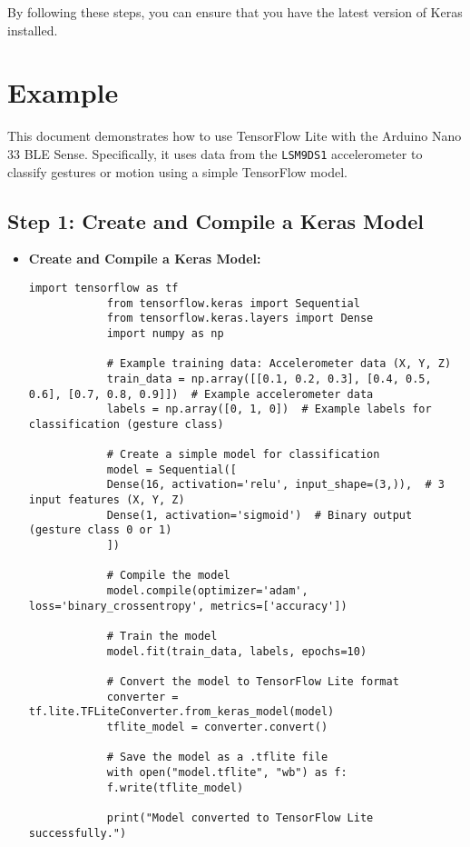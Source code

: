 	By following these steps, you can ensure that you have the latest version of Keras installed.
	
	
	\section{Example}
	This document demonstrates how to use TensorFlow Lite with the Arduino Nano 33 BLE Sense. Specifically, it uses data from the \texttt{LSM9DS1} accelerometer to classify gestures or motion using a simple TensorFlow model.
	
	\subsection{Step 1: Create and Compile a Keras Model}
	
	\begin{itemize}
		\item \textbf{Create and Compile a Keras Model:}
		\begin{lstlisting}[caption={Creating a Keras Model}, label={code:create-keras-model}, style=pythonstyle]
			import tensorflow as tf
			from tensorflow.keras import Sequential
			from tensorflow.keras.layers import Dense
			import numpy as np
			
			# Example training data: Accelerometer data (X, Y, Z)
			train_data = np.array([[0.1, 0.2, 0.3], [0.4, 0.5, 0.6], [0.7, 0.8, 0.9]])  # Example accelerometer data
			labels = np.array([0, 1, 0])  # Example labels for classification (gesture class)
			
			# Create a simple model for classification
			model = Sequential([
			Dense(16, activation='relu', input_shape=(3,)),  # 3 input features (X, Y, Z)
			Dense(1, activation='sigmoid')  # Binary output (gesture class 0 or 1)
			])
			
			# Compile the model
			model.compile(optimizer='adam', loss='binary_crossentropy', metrics=['accuracy'])
			
			# Train the model
			model.fit(train_data, labels, epochs=10)
			
			# Convert the model to TensorFlow Lite format
			converter = tf.lite.TFLiteConverter.from_keras_model(model)
			tflite_model = converter.convert()
			
			# Save the model as a .tflite file
			with open("model.tflite", "wb") as f:
			f.write(tflite_model)
			
			print("Model converted to TensorFlow Lite successfully.")
		\end{lstlisting}
	\end{itemize}
	

